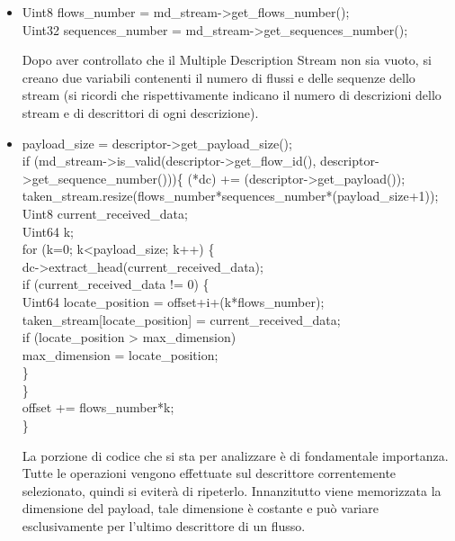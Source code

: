 \begin{itemize}
 \item \begin{code}
Uint8 flows\_number = md\_stream->get\_flows\_number();\\
Uint32 sequences\_number = md\_stream->get\_sequences\_number();\\
\end{code}
Dopo aver controllato che il Multiple Description Stream non sia vuoto, si creano due variabili contenenti il numero di flussi e delle sequenze dello stream (si ricordi che rispettivamente indicano il numero di descrizioni dello stream e di descrittori di ogni descrizione).

 \item \begin{code}
payload\_size = descriptor->get\_payload\_size();\\
if (md\_stream->is\_valid(descriptor->get\_flow\_id(), descriptor->get\_sequence\_number()))\{
	(*dc) += (descriptor->get\_payload());\\
	taken\_stream.resize(flows\_number*sequences\_number*(payload\_size+1));\\
	Uint8 current\_received\_data;\\
	Uint64 k;\\
	for (k=0; k<payload\_size; k++) \{\\
		dc->extract\_head(current\_received\_data);\\
		if (current\_received\_data != 0) \{\\
			Uint64 locate\_position = offset+i+(k*flows\_number);\\
			taken\_stream[locate\_position] = current\_received\_data;\\
			if (locate\_position > max\_dimension)\\
			max\_dimension = locate\_position;\\
		\}\\
	\}\\
	offset += flows\_number*k;\\
\}\\
\end{code}
La porzione di codice che si sta per analizzare è di fondamentale importanza.
Tutte le operazioni vengono effettuate sul descrittore correntemente
selezionato, quindi si eviterà di ripeterlo. Innanzitutto viene memorizzata la
dimensione del payload, tale dimensione è costante e può variare esclusivamente
per l'ultimo descrittore di un flusso.
\begin{notabene}

\end{notabene}
\end{itemize}
